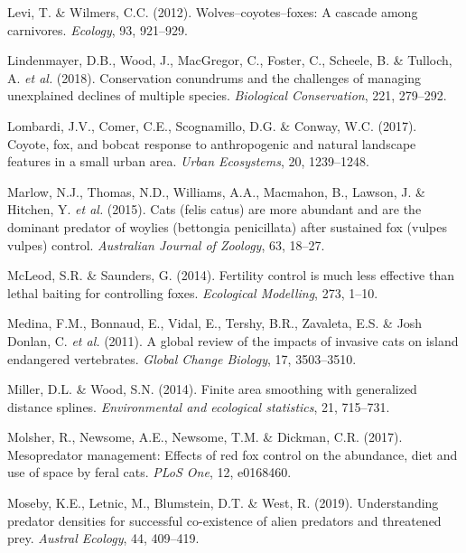\documentclass[]{elsarticle} %
\begin{document}
\leavevmode\hypertarget{ref-https:ux2fux2fdoi.orgux2f10.1890ux2f11-0165.1}{}%
Levi, T. \& Wilmers, C.C. (2012). Wolves--coyotes--foxes: A cascade among carnivores. \emph{Ecology}, 93, 921--929.

\leavevmode\hypertarget{ref-LINDENMAYER2018279}{}%
Lindenmayer, D.B., Wood, J., MacGregor, C., Foster, C., Scheele, B. \& Tulloch, A. \emph{et al.} (2018). Conservation conundrums and the challenges of managing unexplained declines of multiple species. \emph{Biological Conservation}, 221, 279--292.

\leavevmode\hypertarget{ref-lombardi2017coyote}{}%
Lombardi, J.V., Comer, C.E., Scognamillo, D.G. \& Conway, W.C. (2017). Coyote, fox, and bobcat response to anthropogenic and natural landscape features in a small urban area. \emph{Urban Ecosystems}, 20, 1239--1248.

\leavevmode\hypertarget{ref-marlow2015}{}%
Marlow, N.J., Thomas, N.D., Williams, A.A., Macmahon, B., Lawson, J. \& Hitchen, Y. \emph{et al.} (2015). Cats (felis catus) are more abundant and are the dominant predator of woylies (bettongia penicillata) after sustained fox (vulpes vulpes) control. \emph{Australian Journal of Zoology}, 63, 18--27.

\leavevmode\hypertarget{ref-mcleod2014}{}%
McLeod, S.R. \& Saunders, G. (2014). Fertility control is much less effective than lethal baiting for controlling foxes. \emph{Ecological Modelling}, 273, 1--10.

\leavevmode\hypertarget{ref-medina2011}{}%
Medina, F.M., Bonnaud, E., Vidal, E., Tershy, B.R., Zavaleta, E.S. \& Josh Donlan, C. \emph{et al.} (2011). A global review of the impacts of invasive cats on island endangered vertebrates. \emph{Global Change Biology}, 17, 3503--3510.

\leavevmode\hypertarget{ref-miller2014}{}%
Miller, D.L. \& Wood, S.N. (2014). Finite area smoothing with generalized distance splines. \emph{Environmental and ecological statistics}, 21, 715--731.

\leavevmode\hypertarget{ref-molsher2017}{}%
Molsher, R., Newsome, A.E., Newsome, T.M. \& Dickman, C.R. (2017). Mesopredator management: Effects of red fox control on the abundance, diet and use of space by feral cats. \emph{PLoS One}, 12, e0168460.

\leavevmode\hypertarget{ref-moseby2019}{}%
Moseby, K.E., Letnic, M., Blumstein, D.T. \& West, R. (2019). Understanding predator densities for successful co-existence of alien predators and threatened prey. \emph{Austral Ecology}, 44, 409--419.
\end{document}
